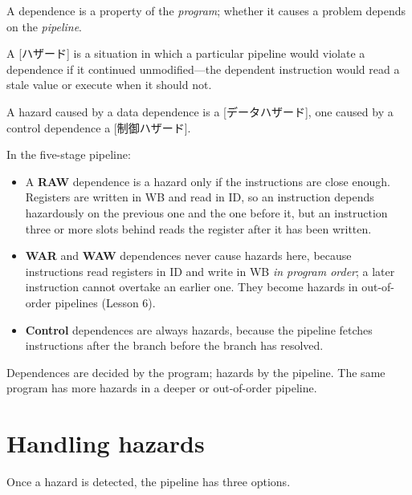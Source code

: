 \documentclass[../main.tex]{subfiles}
\begin{document}
A dependence is a property of the \emph{program}; whether it causes a
problem depends on the \emph{pipeline}.

\begin{definition}[Hazard]
  A [ハザード] is a situation in which a particular pipeline
  would violate a dependence if it continued unmodified---the dependent
  instruction would read a stale value or execute when it should not.
\end{definition}

A hazard caused by a data dependence is a [データハザード],
one caused by a control dependence a [制御ハザード].

In the five-stage pipeline:
\begin{itemize}
  \item A \textbf{RAW} dependence is a hazard only if the instructions are
    close enough.  Registers are written in WB and read in ID, so an
    instruction depends hazardously on the previous one and the one before
    it, but an instruction three or more slots behind reads the register
    after it has been written.
  \item \textbf{WAR} and \textbf{WAW} dependences never cause hazards here,
    because instructions read registers in ID and write in WB \emph{in
    program order}; a later instruction cannot overtake an earlier one.
    They become hazards in out-of-order pipelines (Lesson 6).
  \item \textbf{Control} dependences are always hazards, because the
    pipeline fetches instructions after the branch before the branch has
    resolved.
\end{itemize}

\begin{keypoint}
  Dependences are decided by the program; hazards by the pipeline.  The
  same program has more hazards in a deeper or out-of-order pipeline.
\end{keypoint}

\section{Handling hazards}

Once a hazard is detected, the pipeline has three options.
\end{document}
